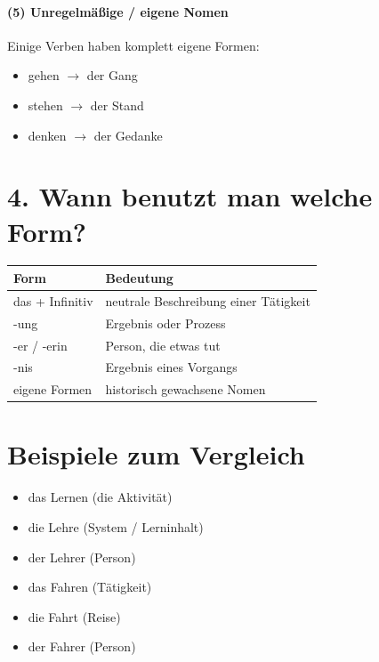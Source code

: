        \paragraph{(5) Unregelmäßige / eigene Nomen}
            Einige Verben haben komplett eigene Formen:
        \begin{itemize}
            \item gehen $\rightarrow$ der Gang
            \item stehen $\rightarrow$ der Stand
            \item denken $\rightarrow$ der Gedanke
            \end{itemize}

\section{4. Wann benutzt man welche Form?}
    
    \begin{tabular}{|l|l|}
        \hline
        \textbf{Form}   & \textbf{Bedeutung}                    \\
        \hline
         das + Infinitiv & neutrale Beschreibung einer Tätigkeit \\
        -ung            & Ergebnis oder Prozess                 \\
        -er / -erin     & Person, die etwas tut                 \\
        -nis            & Ergebnis eines Vorgangs               \\
        eigene Formen   & historisch gewachsene Nomen           \\
        \hline
    \end{tabular}

\section{Beispiele zum Vergleich}
    \begin{itemize}
        \item das Lernen (die Aktivität)
        \item die Lehre (System / Lerninhalt)
        \item der Lehrer (Person)
        \item das Fahren (Tätigkeit)
        \item die Fahrt (Reise)
        \item der Fahrer (Person)
    \end{itemize}

